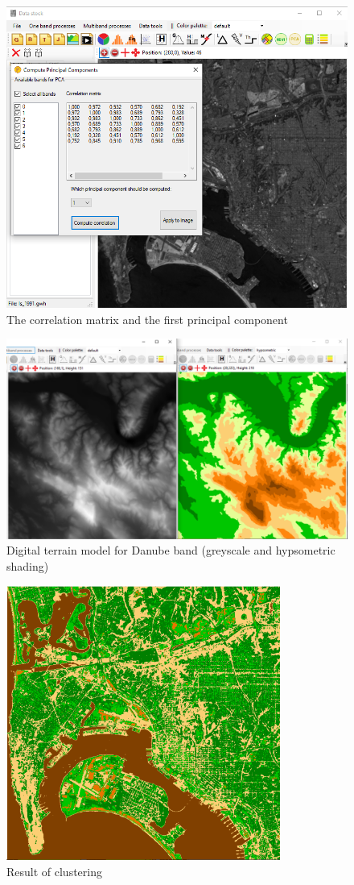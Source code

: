 \documentclass[a4paper,12pt]{article}
\begin{document}
	\begin{figure}
	\centering
	\includegraphics[width=12cm]{pca2.png}
	\caption{The correlation matrix and the first principal component}
	\label{fig:pca2}
	\end{figure}

	\begin{figure}
	\centering
	\includegraphics[width=12cm]{dtm.png}
	\caption{Digital terrain model for Danube band (greyscale and hypsometric shading)}
	\label{fig:dtm}
	\end{figure}

	\begin{figure}
	\centering
	\includegraphics[width=9cm]{cluster.png}
	\caption{Result of clustering}
	\label{fig:cluster}
	\end{figure}
\end{document}
